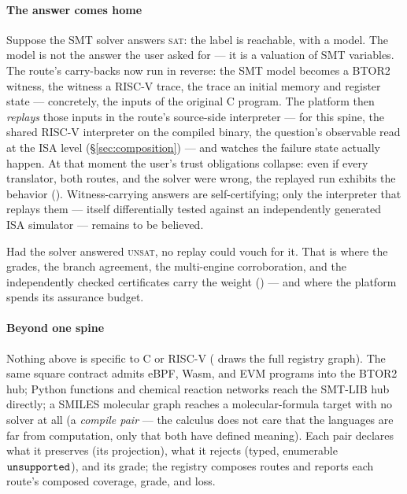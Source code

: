 \paragraph{The answer comes home}
Suppose the SMT solver answers \textsc{sat}: the label is reachable, with
a model. The model is not the answer the user asked for --- it is a
valuation of SMT variables. The route's carry-backs now run in reverse:
the SMT model becomes a BTOR2 witness, the witness a RISC-V trace, the
trace an initial memory and register state --- concretely, the inputs of
the original C program. The platform then \emph{replays} those inputs in
the route's source-side interpreter --- for this spine, the shared
RISC-V interpreter on the compiled binary, the question's observable
read at the ISA level (\S\ref{sec:composition}) --- and watches the
failure state actually happen.
At that moment the user's trust obligations collapse: even if every
translator, both routes, and the solver were wrong, the replayed run
exhibits the behavior (). Witness-carrying answers
are self-certifying; only the interpreter that replays them --- itself
differentially tested against an independently generated ISA simulator ---
remains to be believed.

Had the solver answered \textsc{unsat}, no replay could vouch for it.
That is where the grades, the branch agreement, the multi-engine
corroboration, and the independently checked certificates carry the
weight () --- and where the platform spends its
assurance budget.

\paragraph{Beyond one spine}
Nothing above is specific to C or RISC-V
( draws the full registry graph). The same square contract admits
eBPF, Wasm, and EVM programs into the BTOR2 hub; Python functions and
chemical reaction networks reach the SMT-LIB hub directly; a SMILES
molecular graph reaches a molecular-formula target with no solver at all
(a \emph{compile pair} --- the calculus does not care that the languages
are far from computation, only that both have defined meaning). Each
pair declares what it preserves (its projection), what it rejects (typed,
enumerable $\mathtt{unsupported}$), and its grade; the registry composes routes
and reports each route's composed coverage, grade, and loss.

